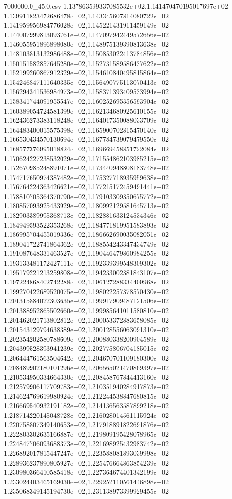 \begin{filecontents*}{7000000.0_45.0.csv}
1.137863599337085532e+02,1.141470470195017697e+02
1.139911823472686478e+02,1.143345607814080722e+02
1.141959956984776028e+02,1.145221431911459149e+02
1.144007999813093761e+02,1.147097942449572656e+02
1.146055951896898080e+02,1.148975139390813638e+02
1.148103813132986488e+02,1.150853022413784856e+02
1.150151582857645280e+02,1.152731589586437622e+02
1.152199260867912329e+02,1.154610840495815864e+02
1.154246847111640335e+02,1.156490775113070413e+02
1.156294341536984973e+02,1.158371393409533994e+02
1.158341744091955547e+02,1.160252695356593904e+02
1.160389054724581399e+02,1.162134680925610155e+02
1.162436273383118248e+02,1.164017350088033709e+02
1.164483400015575398e+02,1.165900702815470140e+02
1.166530434570130694e+02,1.167784739079479550e+02
1.168577376995018824e+02,1.169669458851722084e+02
1.170624227238532029e+02,1.171554862103985215e+02
1.172670985248891071e+02,1.173440948808183748e+02
1.174717650974387482e+02,1.175327718935959638e+02
1.176764224363426621e+02,1.177215172459491441e+02
1.178810705364370790e+02,1.179103309350675772e+02
1.180857093925433929e+02,1.180992129581645713e+02
1.182903389995368713e+02,1.182881633124534346e+02
1.184949593522353268e+02,1.184771819951583893e+02
1.186995704455019336e+02,1.186662690035082051e+02
1.189041722741864362e+02,1.188554243347434749e+02
1.191087648331463527e+02,1.190446479860984255e+02
1.193133481172427111e+02,1.192339399548309302e+02
1.195179221213259808e+02,1.194233002381843107e+02
1.197224868402742288e+02,1.196127288334409968e+02
1.199270422689520075e+02,1.198022257378570430e+02
1.201315884022303635e+02,1.199917909487121506e+02
1.201388952865502660e+02,1.199985641011580810e+02
1.201462021713802812e+02,1.200053372883658085e+02
1.201543129794638389e+02,1.200128556063091310e+02
1.202354202580788609e+02,1.200880338200904589e+02
1.204399528393941239e+02,1.202775806704185015e+02
1.206444761563504642e+02,1.204670701109180300e+02
1.208489902180101296e+02,1.206565021470869397e+02
1.210534950334664330e+02,1.208458767844413160e+02
1.212579906117709783e+02,1.210351940284917873e+02
1.214624769619980924e+02,1.212244538847680815e+02
1.216669540932191182e+02,1.214136563587899218e+02
1.218714220145048728e+02,1.216028014561115924e+02
1.220758807349140653e+02,1.217918891822691876e+02
1.222803302635166887e+02,1.219809195428078965e+02
1.224847706093688373e+02,1.221698925432983742e+02
1.226892017815447247e+02,1.223588081893039998e+02
1.228936237890805927e+02,1.225476664863854239e+02
1.230980366410585418e+02,1.227364674401342199e+02
1.233024403465169030e+02,1.229252110561446898e+02
1.235068349145194730e+02,1.231138973399929455e+02

\end{filecontents*}
